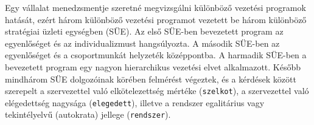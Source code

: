 \documentclass[
  letterpaper,
]{krantz}
\makeatletter
\newenvironment{Shaded}{\begin{snugshade}}{\end{snugshade}}
\newcommand{\AttributeTok}[1]{\textcolor[rgb]{0.40,0.45,0.13}{#1}}
\newcommand{\CommentTok}[1]{\textcolor[rgb]{0.37,0.37,0.37}{#1}}
\newcommand{\FunctionTok}[1]{\textcolor[rgb]{0.28,0.35,0.67}{#1}}
\newcommand{\NormalTok}[1]{\textcolor[rgb]{0.00,0.23,0.31}{#1}}
\newcommand{\OtherTok}[1]{\textcolor[rgb]{0.00,0.23,0.31}{#1}}
\newcommand{\SpecialCharTok}[1]{\textcolor[rgb]{0.37,0.37,0.37}{#1}}
\newcommand{\StringTok}[1]{\textcolor[rgb]{0.13,0.47,0.30}{#1}}
\newenvironment{kframe}{%
\medskip{}
\setlength{\fboxsep}{.8em}
 \def\at@end@of@kframe{}%
 \ifinner\ifhmode%
  \def\at@end@of@kframe{\end{minipage}}%
  \begin{minipage}{\columnwidth}%
 \fi\fi%
 \def\FrameCommand##1{\hskip\@totalleftmargin \hskip-\fboxsep
 \colorbox{shadecolor}{##1}\hskip-\fboxsep
     \hskip-\linewidth \hskip-\@totalleftmargin \hskip\columnwidth}%
 \MakeFramed {\advance\hsize-\width
   \@totalleftmargin\z@ \linewidth\hsize
   \@setminipage}}%
 {\par\unskip\endMakeFramed%
 \at@end@of@kframe}
\renewenvironment{Shaded}{\begin{kframe}}{\end{kframe}}
\makeatother
\begin{document}
Egy vállalat menedzsmentje szeretné megvizsgálni különböző vezetési
programok hatását, ezért három különböző vezetési programot vezetett be
három különböző stratégiai üzleti egységben (SÜE). Az első SÜE-ben
bevezetett program az egyenlőséget és az individualizmust hangsúlyozta.
A második SÜE-ben az egyenlőséget és a csoportmunkát helyzeték
középpontba. A harmadik SÜE-ben a bevezetett program egy nagyon
hierarchikus vezetési elvet alkalmazott. Később mindhárom SÜE
dolgozóinak körében felmérést végeztek, és a kérdések között szerepelt a
szervezettel való elkötelezettség mértéke (\texttt{szelkot}), a
szervezettel való elégedettség nagysága (\texttt{elegedett}), illetve a
rendszer egalitárius vagy tekintélyelvű (autokrata) jellege
(\texttt{rendszer}).

\begin{Shaded}
\end{Shaded}
\end{document}
